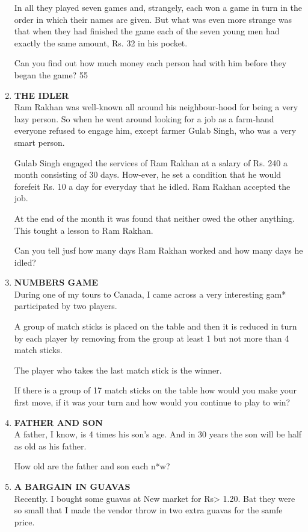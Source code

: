 \documentclass[12pt]{article}
\begin{document}
\begin{enumerate}
In all they  played  seven  games  and,  strangely,  each won a game  in turn  in the order  in which  their  names  are given.  But  what  was  even  more  strange  was  that  when they had finished  the game  each  of the seven  young  men had exactly  the same  amount,  Rs. 32 in his pocket. 

Can you find  out how  much  money  each  person  had with him  before  they  began  the game? 
55 
%
\item \textbf{THE  IDLER} \\
Ram  Rakhan  was  well-known  all around  his neighbour-hood  for being  a very  lazy  person.  So  when  he went around  looking  for a job as a farm-hand  everyone  refused to engage  him,  except  farmer  Gulab  Singh,  who  was a very smart  person. 

Gulab  Singh  engaged  the services  of Ram  Rakhan  at a salary  of Rs. 240 a month  consisting  of 30 days.  How-ever,  he set a condition  that  he would  forefeit  Rs. 10 a day for everyday  that  he idled.  Ram  Rakhan  accepted the job. 

At the  end  of the  month  it was  found  that  neither owed  the other  anything.  This  tought  a lesson  to Ram Rakhan. 

Can you tell jusf how  many  days  Ram  Rakhan  worked and how  many  days  he idled?

%
\item \textbf{NUMBERS  GAME} \\ 
During  one of my tours  to Canada,  I came  across  a very interesting  gam*  participated  by two players. 

A group  of match  sticks  is placed  on the table  and then it is reduced  in turn  by each  player  by removing  from the group  at least  1 but not more  than  4 match  sticks. 

The player  who  takes  the  last  match  stick  is the winner. 

If there  is a group  of 17 match  sticks  on the table  how would  you  make  your  first  move,  if it was  your  turn  and how would  you continue  to play  to win? 
%
\item \textbf{FATHER  AND  SON} \\
A father,  I know,  is 4 times  his  son's  age.  And  in 30 years  the son will be half as old as his father. 

How  old are the father  and son each  n*w? 
%
\item \textbf{A  BARGAIN  IN GUAVAS} \\
Recently.  I bought  some  guavas  at New  market  for Rs> 1.20.  Bat  they  were  so small  that  I made  the vendor throw  in two extra  guavas  for the samfe  price. 


\end{enumerate}
\end{document}
